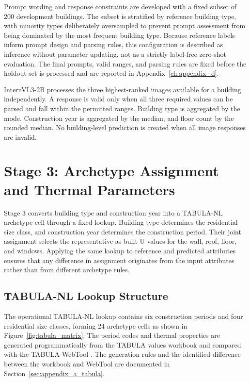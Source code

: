 Prompt wording and response constraints are developed with a fixed subset of 200 development buildings.
The subset is stratified by reference building type, with minority types deliberately oversampled to prevent prompt assessment from being dominated by the most frequent building type.
Because reference labels inform prompt design and parsing rules, this configuration is described as inference without parameter updating, not as a strictly label-free zero-shot evaluation.
The final prompts, valid ranges, and parsing rules are fixed before the holdout set is processed and are reported in Appendix~\ref{ch:appendix_d}.

InternVL3-2B processes the three highest-ranked images available for a building independently.
A response is valid only when all three required values can be parsed and fall within the permitted ranges.
Building type is aggregated by the mode.
Construction year is aggregated by the median, and floor count by the rounded median.
No building-level prediction is created when all image responses are invalid.

\section{Stage 3: Archetype Assignment and Thermal Parameters}
\label{sec:tabula_archetype_matching}

Stage 3 converts building type and construction year into a TABULA-NL archetype cell through a fixed lookup.
Building type determines the residential size class, and construction year determines the construction period.
Their joint assignment selects the representative as-built U-values for the wall, roof, floor, and windows.
Applying the same lookup to reference and predicted attributes ensures that any difference in assignment originates from the input attributes rather than from different archetype rules.

\subsection{TABULA-NL Lookup Structure}
\label{sec:tabula_nl_matrix}

The operational TABULA-NL lookup contains six construction periods and four residential size classes, forming 24 archetype cells as shown in Figure~\ref{fig:tabula_matrix}.
The period codes and thermal properties are generated programmatically from the TABULA values workbook and compared with the TABULA WebTool \parencite{tabulawebtool}.
The generation rules and the identified difference between the workbook and WebTool are documented in Section~\ref{sec:appendix_a_tabula}.

